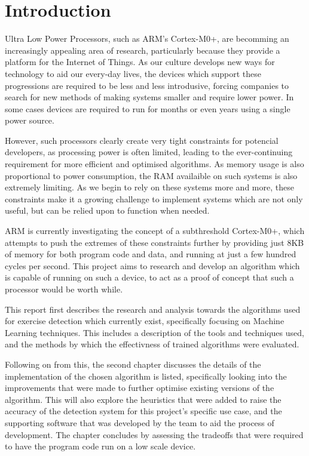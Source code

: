 \chapter{Introduction}

Ultra Low Power Processors, such as ARM's Cortex-M0+, are becomming an increasingly appealing area of research, particularly because they provide a platform for the Internet of Things. As our culture develops new ways for technology to aid our every-day lives, the devices which support these progressions are required to be less and less introdusive, forcing companies to search for new methods of making systems smaller and require lower power. In some cases devices are required to run for months or even years using a single power source.

However, such processors clearly create very tight constraints for potencial developers, as processing power is often limited, leading to the ever-continuing requirement for more efficient and optimised algorithms. As memory usage is also proportional to power consumption, the RAM availaible on such systems is also extremely limiting. As we begin to rely on these systems more and more, these constraints make it a growing challenge to implement systems which are not only useful, but can be relied upon to function when needed.


ARM is currently investigating the concept of a subthreshold Cortex-M0+, which attempts to push the extremes of these constraints further by providing just 8KB of memory for both program code and data, and running at just a few hundred cycles per second. This project aims to research and develop an algorithm which is capable of running on such a device, to act as a proof of concept that such a processor would be worth while.

This report first describes the research and analysis towards the algorithms used for exercise detection which currently exist, specifically focusing on Machine Learning techniques. This includes a description of the tools and techniques used, and the methods by which the effectivness of trained algorithms were evaluated.

Following on from this, the second chapter discusses the details of the implementation of the chosen algorithm is listed, specifically looking into the improvements that were made to further optimise existing versions of the algorithm. This will also explore the heuristics that were added to raise the accuracy of the detection system for this project's specific use case, and the supporting software that was developed by the team to aid the process of development. The chapter concludes by assessing the tradeoffs that were required to have the program code run on a low scale device.

